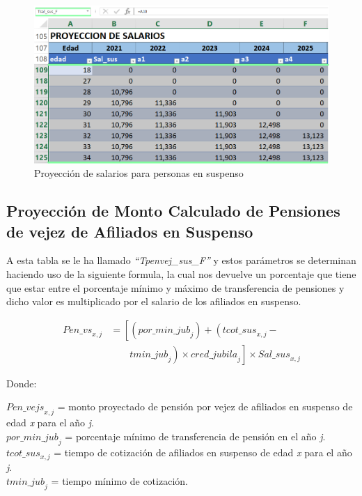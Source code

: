 \documentclass[
  letterpaper,
  DIV=11,
  numbers=noendperiod]{scrreprt}
\begin{document}
\begin{figure}

{\centering \includegraphics{images/F/Img23.png}

}

\caption{Proyección de salarios para personas en suspenso}

\end{figure}

\hypertarget{proyecciuxf3n-de-monto-calculado-de-pensiones-de-vejez-de-afiliados-en-suspenso}{%
\subsection{Proyección de Monto Calculado de Pensiones de vejez de
Afiliados en
Suspenso}\label{proyecciuxf3n-de-monto-calculado-de-pensiones-de-vejez-de-afiliados-en-suspenso}}

A esta tabla se le ha llamado \emph{``Tpenvej\_sus\_F''} y estos
parámetros se determinan haciendo uso de la siguiente formula, la cual
nos devuelve un porcentaje que tiene que estar entre el porcentaje
mínimo y máximo de transferencia de pensiones y dicho valor es
multiplicado por el salario de los afiliados en suspenso.

\begin{align} {Pen\_vs}_{x,j} &= \left[\left({por\_min\_jub}_j\right)+\left({tcot\_sus}_{x,j}- \right. \right.\nonumber  \\ &\qquad \left. \left. {tmin\_jub}_j\right)\times{cred\_jubila}_j\right]\times{Sal\_sus}_{x,j} \end{align}

Donde:

\({Pen\_vejs}_{x,j}\) = monto proyectado de pensión por vejez de
afiliados en suspenso de edad \emph{x} para el año \emph{j}.\\
\({por\_{min\_{jub}}}_j\) = porcentaje mínimo de transferencia de
pensión en el año \emph{j}.\\
\({tcot\_sus}_{x,j}\) = tiempo de cotización de afiliados en suspenso de
edad \emph{x} para el año \emph{j}.\\
\(t{min\_{jub}}_j\) = tiempo mínimo de cotización.
\end{document}
